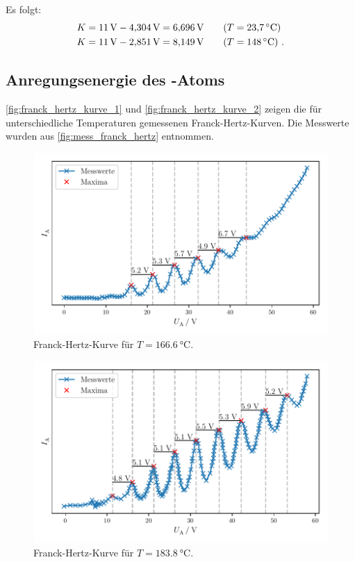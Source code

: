 Es folgt:
\begin{align*}
  K &= \SI{11}{\volt} - \SI{4.304}{\volt} = \SI{6.696}{\volt}
  \tag{$T = \SI{23.7}{\celsius}$} \\
  K &= \SI{11}{\volt} - \SI{2.851}{\volt} = \SI{8.149}{\volt}
  \tag{$T = \SI{148}{\celsius}$} \ .
\end{align*}


\clearpage
\subsection{Anregungsenergie des \texorpdfstring{}{Hg}-Atoms}

\autoref{fig:franck_hertz_kurve_1} und \autoref{fig:franck_hertz_kurve_2}
zeigen die für unterschiedliche Temperaturen gemessenen Franck-Hertz-Kurven.
Die Messwerte wurden aus \autoref{fig:mess_franck_hertz} entnommen.

\begin{figure}
    \centering
    \includegraphics[width=\textwidth]{build/plt/franck_hertz_166_6.pdf}
    \caption{Franck-Hertz-Kurve für $T = \SI{166.6}{\celsius}$.}
    \label{fig:franck_hertz_kurve_1}
\end{figure}

\begin{figure}
    \centering
    \includegraphics[width=\textwidth]{build/plt/franck_hertz_183_8.pdf}
    \caption{Franck-Hertz-Kurve für $T = \SI{183.8}{\celsius}$.}
    \label{fig:franck_hertz_kurve_2}
\end{figure}


